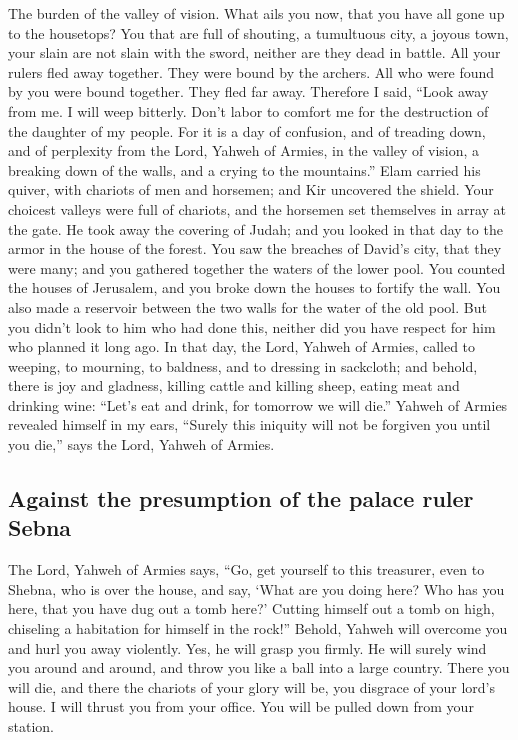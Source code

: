  The burden of the valley of vision. What ails you now,
that you have all gone up to the housetops?  You that are
full of shouting, a tumultuous city, a joyous town, your slain are not
slain with the sword, neither are they dead in battle. 
All your rulers fled away together. They were bound by the archers. All
who were found by you were bound together. They fled far away.
 Therefore I said, ``Look away from me. I will weep
bitterly. Don't labor to comfort me for the destruction of the daughter
of my people.  For it is a day of confusion, and of
treading down, and of perplexity from the Lord, Yahweh of Armies, in the
valley of vision, a breaking down of the walls, and a crying to the
mountains.''  Elam carried his quiver, with chariots of
men and horsemen; and Kir uncovered the shield.  Your
choicest valleys were full of chariots, and the horsemen set themselves
in array at the gate.  He took away the covering of Judah;
and you looked in that day to the armor in the house of the forest.
 You saw the breaches of David's city, that they were
many; and you gathered together the waters of the lower pool.
 You counted the houses of Jerusalem, and you broke down
the houses to fortify the wall.  You also made a
reservoir between the two walls for the water of the old pool. But you
didn't look to him who had done this, neither did you have respect for
him who planned it long ago.  In that day, the Lord,
Yahweh of Armies, called to weeping, to mourning, to baldness, and to
dressing in sackcloth;  and behold, there is joy and
gladness, killing cattle and killing sheep, eating meat and drinking
wine: ``Let's eat and drink, for tomorrow we will die.'' 
Yahweh of Armies revealed himself in my ears, ``Surely this iniquity
will not be forgiven you until you die,'' says the Lord, Yahweh of
Armies.

\hypertarget{against-the-presumption-of-the-palace-ruler-sebna}{%
\subsection{Against the presumption of the palace ruler
Sebna}\label{against-the-presumption-of-the-palace-ruler-sebna}}

 The Lord, Yahweh of Armies says, ``Go, get yourself to
this treasurer, even to Shebna, who is over the house, and say,
 `What are you doing here? Who has you here, that you
have dug out a tomb here?' Cutting himself out a tomb on high, chiseling
a habitation for himself in the rock!''  Behold, Yahweh
will overcome you and hurl you away violently. Yes, he will grasp you
firmly.  He will surely wind you around and around, and
throw you like a ball into a large country. There you will die, and
there the chariots of your glory will be, you disgrace of your lord's
house.  I will thrust you from your office. You will be
pulled down from your station.

